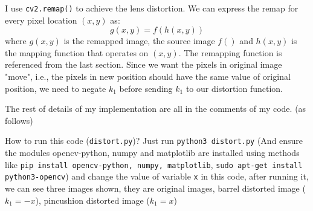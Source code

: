 \documentclass[12pt]{article}
\begin{document}
I use \texttt{cv2.remap()} to achieve the lens distortion. We can express the remap for every pixel location $(x,y)$
as:
$$g(x,y)=f(h(x,y))$$
where $g(x,y)$ is the remapped image, the source image $f()$ and $h(x,y)$ is the mapping function that operates on $(x,y)$. The remapping function is referenced from the last section. Since we want the pixels in original image "move", i.e., the pixels in new position should have the same value of original position, we need to negate $k_1$ before sending $k_1$ to our distortion function.

The rest of details of my implementation are all in the comments of my code. (as follows)

How to run this code (\texttt{distort.py})? Just run \texttt{python3 distort.py} (And ensure the modules opencv-python, numpy and matplotlib are installed using methods like \texttt{pip install opencv-python, numpy, matplotlib}, \texttt{sudo apt-get install python3-opencv}) and change the value of variable \texttt{x} in this code, after running it, we can see three images shown, they are original images, barrel distorted image ($k_1=-x$), pincushion distorted image ($k_1=x$)
\end{document}
